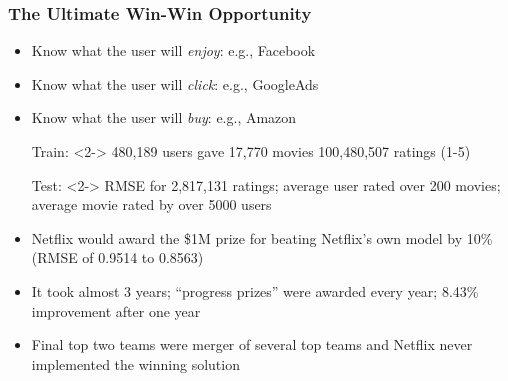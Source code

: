 \documentclass[xcolor={dvipsnames}]{beamer}
\begin{document}
\frame
{
\frametitle{The Ultimate Win-Win Opportunity}

\begin{itemize}
\item Know what the user will \emph{enjoy}: e.g., Facebook
\item Know what the user will \emph{click}: e.g., GoogleAds
\item Know what the user will \emph{buy}: e.g., Amazon
\end{itemize}


\begin{itemize}
\tiny
\item[Train:]<2-> 480,189 users gave 17,770 movies 100,480,507 ratings (1-5)
\item[Test:]<2-> RMSE for 2,817,131 ratings; average user rated over 200 movies;
average movie rated by over 5000 users
\item<2-> Netflix would award the \$1M prize for beating Netflix's own model by 10\% 
(RMSE of 0.9514 to 0.8563)
\item<3-> It took almost 3 years; ``progress prizes'' were awarded every year; 8.43\%
improvement after one year
\item<3-> Final top two teams were merger of several top teams and Netflix never implemented 
the winning solution
\end{itemize}

}
\end{document}
